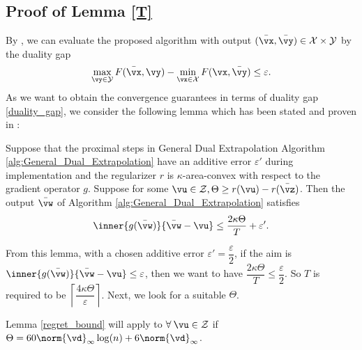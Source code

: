 \subsection{Proof of Lemma \ref{T}}
By \citep[Lemma 2]{Jambulapati-2019-Direct}, we can evaluate the proposed algorithm with output $(\bar{\vx}, \bar{\vy}) \in \mathcal{X} \times \mathcal{Y}$ by the duality gap 
\begin{equation} \label{duality_gap}
    \max_{\vy \in \mathcal{Y}} F(\bar{\vx},\vy) - \min_{\vx \in \mathcal{X}} F(\vx, \bar{\vy}) \leq \varepsilon. 
\end{equation}
As we want to obtain the convergence guarantees in terms of duality gap \eqref{duality_gap}, we consider the following lemma which has been stated and proven in \citep[Corollary 1]{Jambulapati-2019-Direct}:
\begin{lemma} \label{regret_bound}
    Suppose that the proximal steps in General Dual Extrapolation Algorithm \ref{alg:General_Dual_Extrapolation} have an additive error $\varepsilon'$ during implementation and the regularizer $r$ is $\kappa$-area-convex with respect to the gradient operator $g$. Suppose for some $\vu \in \mathcal{Z}, \Theta \geq r(\vu) - r(\Bar{\vz})$. Then the output $\Bar{\vw}$ of Algorithm 
    \ref{alg:General_Dual_Extrapolation} satisfies
    \begin{equation*}
        \inner{g(\Bar{\vw})}{\Bar{\vw}-\vu} \leq \frac{2 \kappa \Theta}{T} + \varepsilon'.
    \end{equation*}
\end{lemma}
From this lemma, with a chosen additive error $\varepsilon' = \dfrac{\varepsilon}{2}$, if the aim is $\inner{g(\Bar{\vw})}{\Bar{\vw}-\vu} \leq \varepsilon$, then we want to have $\dfrac{2 \kappa \Theta}{T} \leq \dfrac{\varepsilon}{2}$. So $T$ is required to be $\left\lceil \dfrac{4 \kappa \Theta}{\varepsilon} \right\rceil$. Next, we look for a suitable $\Theta$.
\begin{lemma} \label{T}
    Lemma \ref{regret_bound} will apply to $\forall \: \vu \in \mathcal{Z}$ if $\Theta = 60 \norm{\vd}_\infty \log (n) + 6 \norm{\vd}_\infty$.
\end{lemma}
